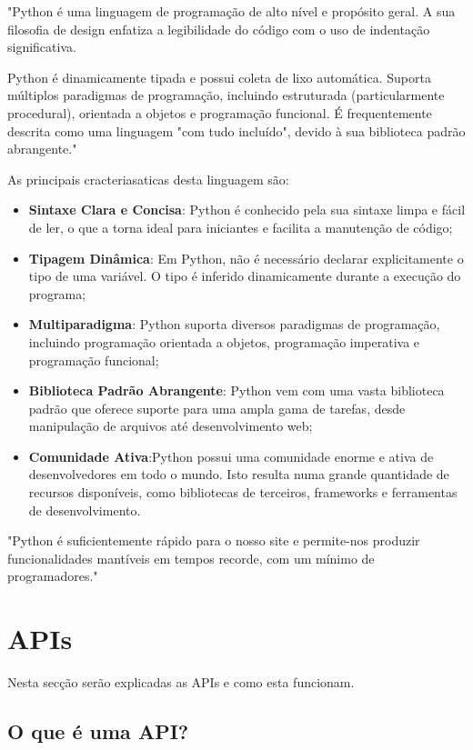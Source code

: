 "Python é uma linguagem de programação de alto nível e propósito geral. A sua filosofia
de design enfatiza a legibilidade do código com o uso de indentação significativa.

Python é dinamicamente tipada e possui coleta de lixo automática. 
Suporta múltiplos paradigmas de programação, incluindo estruturada (particularmente 
procedural), orientada a objetos e programação funcional. É frequentemente descrita como 
uma linguagem "com tudo incluído", devido à sua biblioteca padrão abrangente." \cite{python}



As principais cracteriasaticas desta linguagem são:

\begin{itemize}
\item \textbf{Sintaxe Clara e Concisa}: Python é conhecido pela sua sintaxe limpa
e fácil de ler, o que a torna ideal para iniciantes e facilita a manutenção de código;
\item \textbf{Tipagem Dinâmica}: Em Python, não é necessário declarar explicitamente o
tipo de uma variável. O tipo é inferido dinamicamente durante a execução do programa;
\item \textbf{Multiparadigma}: Python suporta diversos paradigmas de programação,
incluindo programação orientada a objetos, programação imperativa e programação funcional;
\item \textbf{Biblioteca Padrão Abrangente}: Python vem com uma vasta biblioteca 
padrão que oferece suporte para uma ampla gama de tarefas, desde manipulação de arquivos 
até desenvolvimento web;
\item \textbf{Comunidade Ativa}:Python possui uma comunidade enorme e ativa de 
desenvolvedores em todo o mundo. Isto resulta numa grande quantidade
de recursos disponíveis, como bibliotecas de terceiros, frameworks e ferramentas 
de desenvolvimento.
\end{itemize}


"Python é suficientemente rápido para o nosso site e permite-nos produzir funcionalidades 
mantíveis em tempos recorde, com um mínimo de programadores." \cite{pyyt}

\section{APIs}

Nesta secção serão explicadas as APIs e como esta funcionam.


\subsection{O que é uma API?}

